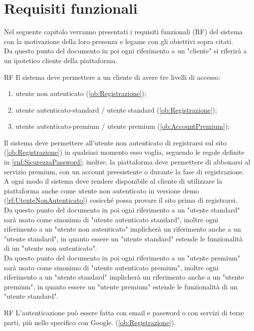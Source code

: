 \section{Requisiti funzionali}
\label{secD1:RequisitiFunzionali}
Nel seguente capitolo verranno presentati i requisiti funzionali (RF) del sistema con la motivazione della loro presenza e legame con gli obiettivi sopra citati.\\
Da questo punto del documento in poi ogni riferimento a un "cliente" si riferirà a un ipotetico cliente della piattaforma.
\begin{listaPersonale}{RF}
	 Il sistema deve permettere a un cliente di avere tre livelli di accesso:
	\begin{enumerate}
		\item utente non autenticato (\ref{ob:Registrazione});
		\item utente autenticato-standard / utente standard (\ref{ob:Registrazione});
		\item utente autenticato-premium / utente premium (\ref{ob:AccountPremium});
	\end{enumerate}
	Il sistema deve permettere all'utente non autenticato di registrarsi sul sito (\ref{ob:Registrazione}) in qualsiasi momento esso voglia, seguendo le regole definite in \ref{rnf:SicurezzaPassword}; inoltre, la piattaforma deve permettere di abbonarsi al servizio premium, con un account preesistente o durante la fase di registrazione.\\
	A ogni modo il sistema deve rendere disponibile al cliente di utilizzare la piattaforma anche come utente non autenticato in versione demo (\ref{rf:UtenteNonAutenticato}) cosicché possa provare il sito prima di registrarsi.\\
	Da questo punto del documento in poi ogni riferimento a un "utente standard" sarà usato come sinonimo di "utente autenticato standard", inoltre ogni riferimento a un "utente non autenticato" implicherà un riferimento anche a un "utente standard", in quanto essere un "utente standard" estende le funzionalità di un "utente non autenticato".\\
	Da questo punto del documento in poi ogni riferimento a un "utente premium" sarà usato come sinonimo di "utente autenticato premium", inoltre ogni riferimento a un "utente standard" implicherà un riferimento anche a un "utente premium", in quanto essere un "utente premium" estende le funzionalità di un "utente standard".
	\begin{listaPersonale2}{RF}
		 L'autenticazione può essere fatta con email e password o con servizi di terze parti, più nello specifico con Google. (\ref{ob:Registrazione}).
	\end{listaPersonale2}


\end{listaPersonale}
